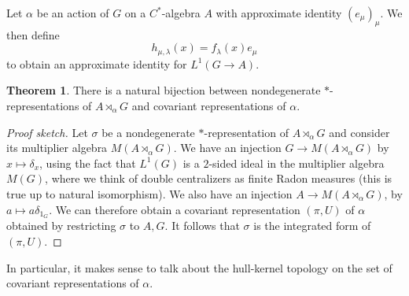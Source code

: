 \documentclass[12pt]{report}
\theoremstyle{definition}
\newtheorem{theorem}{Theorem}[chapter]
\begin{document}
    Let $\alpha$ be an action of $G$ on a $C^*$-algebra $A$ with approximate identity $(e_\mu)_\mu$. We then define
    $$h_{\mu,\lambda}(x) = f_\lambda(x) e_\mu$$
    to obtain an approximate identity for $L^1(G \to A)$.

\begin{theorem}
    There is a natural bijection between nondegenerate $*$-representations of $A \rtimes_\alpha G$ and covariant representations of $\alpha$.
\end{theorem}
\begin{proof}[Proof sketch]
    Let $\sigma$ be a nondegenerate $*$-representation of $A \rtimes_\alpha G$ and consider its multiplier algebra $M(A \rtimes_\alpha G)$. We have an injection $G \to M(A \rtimes_\alpha G)$ by $x \mapsto \delta_x$, using the fact that $L^1(G)$ is a $2$-sided ideal in the multiplier algebra $M(G)$, where we think of double centralizers as finite Radon measures (this is true up to natural isomorphism). We also have an injection $A \to M(A \rtimes_\alpha G)$, by $a \mapsto a \delta_{1_G}$. We can therefore obtain a covariant representation $(\pi, U)$ of $\alpha$ obtained by restricting $\sigma$ to $A,G$. It follows that $\sigma$ is the integrated form of $(\pi, U)$.
\end{proof}
    In particular, it makes sense to talk about the hull-kernel topology on the set of covariant representations of $\alpha$.
\end{document}
